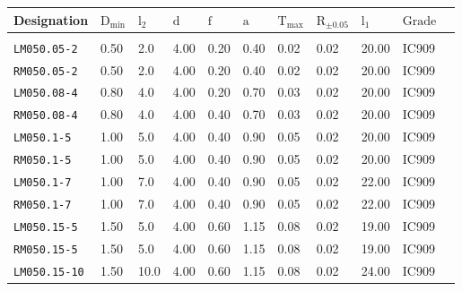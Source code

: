 \begin{table}[h!]
	\footnotesize
\begin{longtable}{l|llllllllll}

Designation
	&$\mathrm{D_{min}}$
	&$\mathrm{l_{2}}$
	&$\mathrm{d}$
	&$\mathrm{f}$
	&$\mathrm{a}$
	&$\mathrm{T_{max}}$
	&$\mathrm{R_{±0.05}}$
	&$\mathrm{l_{1}}$
	&$\mathrm{Grade}$
  \\
\hline
\\
\texttt{LM050.05-2}
    &0.50
    &2.0
    &4.00
    &0.20
    &0.40
    &0.02
    &0.02
    &20.00
    &IC909
  \\


\texttt{RM050.05-2}
    &0.50
    &2.0
    &4.00
    &0.20
    &0.40
    &0.02
    &0.02
    &20.00
    &IC909
  \\


\texttt{LM050.08-4}
    &0.80
    &4.0
    &4.00
    &0.20
    &0.70
    &0.03
    &0.02
    &20.00
    &IC909
  \\


\texttt{RM050.08-4}
    &0.80
    &4.0
    &4.00
    &0.40
    &0.70
    &0.03
    &0.02
    &20.00
    &IC909
  \\


\texttt{LM050.1-5}
    &1.00
    &5.0
    &4.00
    &0.40
    &0.90
    &0.05
    &0.02
    &20.00
    &IC909
  \\


\texttt{RM050.1-5}
    &1.00
    &5.0
    &4.00
    &0.40
    &0.90
    &0.05
    &0.02
    &20.00
    &IC909
  \\


\texttt{LM050.1-7}
    &1.00
    &7.0
    &4.00
    &0.40
    &0.90
    &0.05
    &0.02
    &22.00
    &IC909
  \\


\texttt{RM050.1-7}
    &1.00
    &7.0
    &4.00
    &0.40
    &0.90
    &0.05
    &0.02
    &22.00
    &IC909
  \\


\texttt{LM050.15-5}
    &1.50
    &5.0
    &4.00
    &0.60
    &1.15
    &0.08
    &0.02
    &19.00
    &IC909
  \\


\texttt{RM050.15-5}
    &1.50
    &5.0
    &4.00
    &0.60
    &1.15
    &0.08
    &0.02
    &19.00
    &IC909
  \\


\texttt{LM050.15-10}
    &1.50
    &10.0
    &4.00
    &0.60
    &1.15
    &0.08
    &0.02
    &24.00
    &IC909
  \\



\end{longtable}
\end{table}
